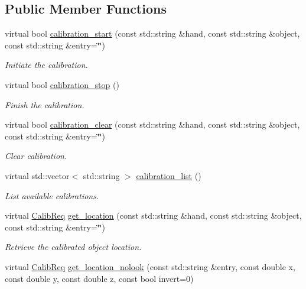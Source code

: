 \subsection*{Public Member Functions}
\begin{DoxyCompactItemize}
\item 
virtual bool \mbox{\hyperlink{classiolReachingCalibration__IDL_a20af0f716383bad118b2267f68316c92}{calibration\+\_\+start}} (const std\+::string \&hand, const std\+::string \&object, const std\+::string \&entry=\char`\"{}\char`\"{})
\begin{DoxyCompactList}\small\item\em Initiate the calibration. \end{DoxyCompactList}\item 
virtual bool \mbox{\hyperlink{classiolReachingCalibration__IDL_ae8fe0658678bb320dada4a2eb13331d1}{calibration\+\_\+stop}} ()
\begin{DoxyCompactList}\small\item\em Finish the calibration. \end{DoxyCompactList}\item 
virtual bool \mbox{\hyperlink{classiolReachingCalibration__IDL_adf20aa3b7dd0b7e7b1239e92e6f4a863}{calibration\+\_\+clear}} (const std\+::string \&hand, const std\+::string \&object, const std\+::string \&entry=\char`\"{}\char`\"{})
\begin{DoxyCompactList}\small\item\em Clear calibration. \end{DoxyCompactList}\item 
virtual std\+::vector$<$ std\+::string $>$ \mbox{\hyperlink{classiolReachingCalibration__IDL_a4a347d8f34cf6f086243b0b6631ec856}{calibration\+\_\+list}} ()
\begin{DoxyCompactList}\small\item\em List available calibrations. \end{DoxyCompactList}\item 
virtual \mbox{\hyperlink{classCalibReq}{Calib\+Req}} \mbox{\hyperlink{classiolReachingCalibration__IDL_a8e13095cc705ebed8c7fee97f84793be}{get\+\_\+location}} (const std\+::string \&hand, const std\+::string \&object, const std\+::string \&entry=\char`\"{}\char`\"{})
\begin{DoxyCompactList}\small\item\em Retrieve the calibrated object location. \end{DoxyCompactList}\item 
virtual \mbox{\hyperlink{classCalibReq}{Calib\+Req}} \mbox{\hyperlink{classiolReachingCalibration__IDL_a7f255b52ec5e2712bb868b0d3834e29b}{get\+\_\+location\+\_\+nolook}} (const std\+::string \&entry, const double x, const double y, const double z, const bool invert=0)

\end{DoxyCompactItemize}
